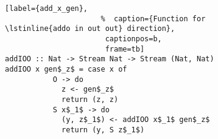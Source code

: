 \begin{figure}[!t]
  \centering
  \begin{minipage}{\columnwidth}
    \begin{lstlisting}[label={add_x_gen},
                      %  caption={Function for \lstinline{addo in out out} direction},
                       captionpos=b,
                       frame=tb]
addIOO :: Nat -> Stream Nat -> Stream (Nat, Nat)
addIOO x gen$_z$ = case x of
           O -> do
             z <- gen$_z$
             return (z, z)
           S x$_1$ -> do
             (y, z$_1$) <- addIOO x$_1$ gen$_z$
             return (y, S z$_1$)
    \end{lstlisting}
  \end{minipage}
\end{figure}
